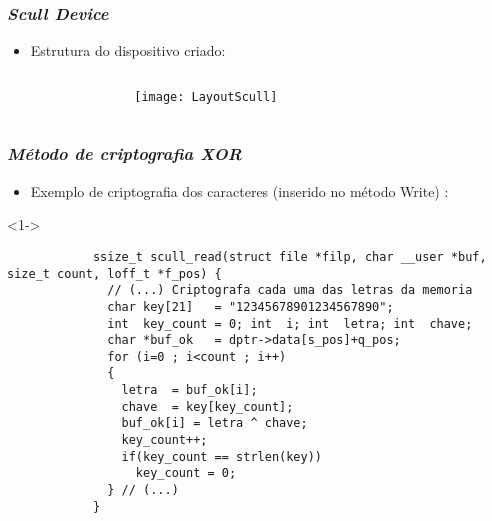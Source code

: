 \begin{frame}
	\frametitle{\textit{Scull Device}}
	\begin{itemize}
		\item<1-> Estrutura do dispositivo criado:
	\end{itemize}
	\begin{columns}[T]
		\begin{column}{.15\textwidth}
		\end{column}
		\begin{column}{.7\textwidth}
			\uncover<1-> {\texttt{[image: LayoutScull]} \tiny{\cite{LinuxDrivers}}}
		\end{column}
		\begin{column}{.15\textwidth}
		\end{column}
	\end{columns}
\end{frame}


\begin{frame}[fragile]
	\frametitle{\textit{Método de criptografia XOR}}
	
	\begin{itemize}
		\item<1-> Exemplo de criptografia dos caracteres (inserido no método Write) \cite{Codecall_XOR}:
	\end{itemize}
	
	\lstset{language=C}

	\begin{block}<1->{}
		\begin{lstlisting}
			ssize_t scull_read(struct file *filp, char __user *buf, size_t count, loff_t *f_pos) {
			  // (...) Criptografa cada uma das letras da memoria
			  char key[21]   = "12345678901234567890";
			  int  key_count = 0; int  i; int  letra; int  chave;
			  char *buf_ok   = dptr->data[s_pos]+q_pos;
			  for (i=0 ; i<count ; i++)
			  {
			    letra  = buf_ok[i];
			    chave  = key[key_count];
			    buf_ok[i] = letra ^ chave;
			    key_count++;
			    if(key_count == strlen(key))
			      key_count = 0;
			  } // (...)
			}
		\end{lstlisting}
	\end{block}

\end{frame}
